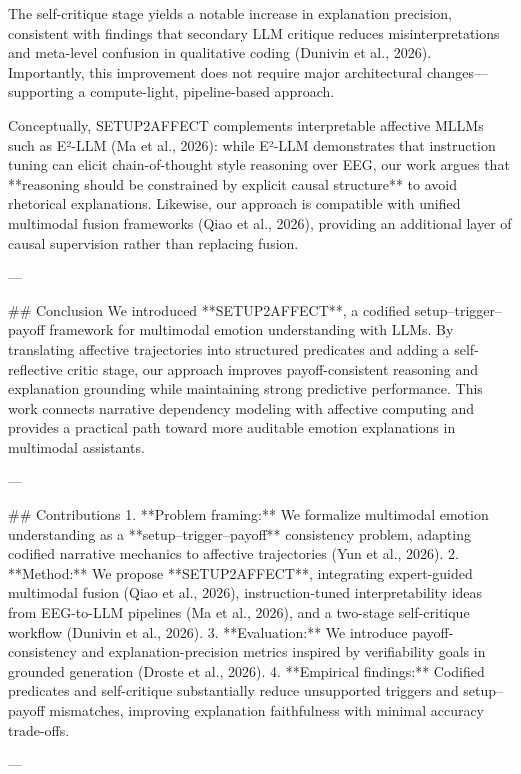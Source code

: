 The self-critique stage yields a notable increase in explanation precision, consistent with findings that secondary LLM critique reduces misinterpretations and meta-level confusion in qualitative coding (Dunivin et al., 2026). Importantly, this improvement does not require major architectural changes—supporting a compute-light, pipeline-based approach.

Conceptually, SETUP2AFFECT complements interpretable affective MLLMs such as E²-LLM (Ma et al., 2026): while E²-LLM demonstrates that instruction tuning can elicit chain-of-thought style reasoning over EEG, our work argues that **reasoning should be constrained by explicit causal structure** to avoid rhetorical explanations. Likewise, our approach is compatible with unified multimodal fusion frameworks (Qiao et al., 2026), providing an additional layer of causal supervision rather than replacing fusion.

---

## Conclusion  
We introduced **SETUP2AFFECT**, a codified setup–trigger–payoff framework for multimodal emotion understanding with LLMs. By translating affective trajectories into structured predicates and adding a self-reflective critic stage, our approach improves payoff-consistent reasoning and explanation grounding while maintaining strong predictive performance. This work connects narrative dependency modeling with affective computing and provides a practical path toward more auditable emotion explanations in multimodal assistants.

---

## Contributions  
1. **Problem framing:** We formalize multimodal emotion understanding as a **setup–trigger–payoff** consistency problem, adapting codified narrative mechanics to affective trajectories (Yun et al., 2026).  
2. **Method:** We propose **SETUP2AFFECT**, integrating expert-guided multimodal fusion (Qiao et al., 2026), instruction-tuned interpretability ideas from EEG-to-LLM pipelines (Ma et al., 2026), and a two-stage self-critique workflow (Dunivin et al., 2026).  
3. **Evaluation:** We introduce payoff-consistency and explanation-precision metrics inspired by verifiability goals in grounded generation (Droste et al., 2026).  
4. **Empirical findings:** Codified predicates and self-critique substantially reduce unsupported triggers and setup–payoff mismatches, improving explanation faithfulness with minimal accuracy trade-offs.

---
